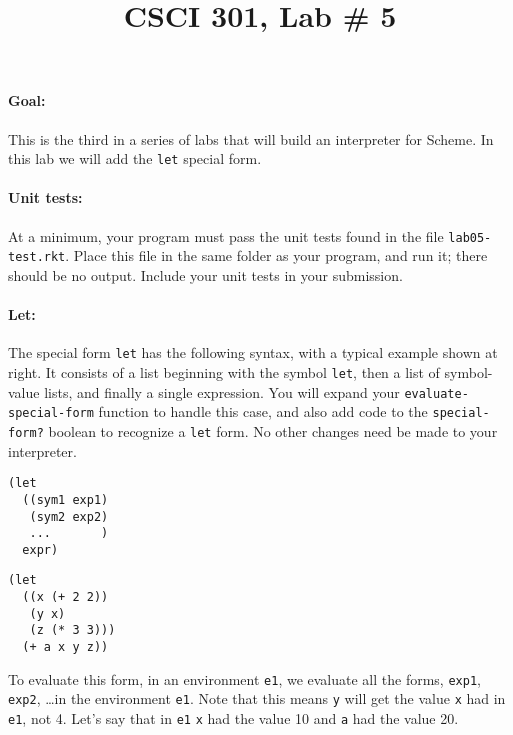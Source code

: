 \documentclass[letterpaper,12pt]{article}
\title{CSCI 301, Lab \# 5}
\author{\term}
\begin{document}
\maketitle
\begin{multicols}{2}

  \paragraph{Goal:} This is the third in a series of labs that will build an
  interpreter for Scheme.  In this lab we will add the \verb|let| special form.

  \paragraph{Unit tests:}
  At a minimum, your program must pass the unit tests found in the
  file \verb|lab05-test.rkt|.  Place this file in the same folder
  as your program, and run it;  there should be no output.  Include
  your unit tests in your submission.

  \paragraph{Let:}
  
  The special form \verb|let| has the following syntax, with a typical example
  shown at right.  It consists of a list beginning with the symbol \verb|let|,
  then a list of symbol-value lists, and finally a single expression.  You will
  expand your \verb|evaluate-special-form| function to handle this case, and
  also add code to the \verb|special-form?| boolean to recognize a \verb|let|
  form.  No other changes need be made to your interpreter.
  \begin{multicols}{2}
\begin{Verbatim}
(let 
  ((sym1 exp1)
   (sym2 exp2)
   ...       )
  expr)
\end{Verbatim}
\begin{Verbatim}
(let 
  ((x (+ 2 2))
   (y x)
   (z (* 3 3)))
  (+ a x y z))
\end{Verbatim}
  \end{multicols}
  To evaluate this form, in an environment \verb|e1|, we evaluate all the forms,
  \verb|exp1|, \verb|exp2|, \ldots in the environment \verb|e1|.  Note that this
  means \verb|y| will get the value \verb|x| had in \verb|e1|, not 4.  Let's say
  that in \verb|e1| \verb|x| had the value 10 and \verb|a| had the value 20.
  

\end{multicols}
\end{document}
